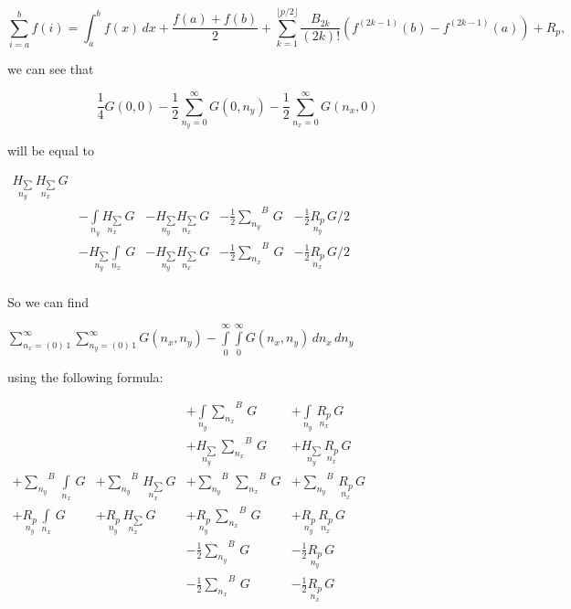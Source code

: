 \documentclass[11pt]{article}
\begin{document}
    \[{\displaystyle \sum _{i=a}^{b}f(i)=\int _{a}^{b}f(x)\,dx+{\frac {f(a)+f(b)}{2}}+\sum _{k=1}^{\lfloor p/2\rfloor }{\frac {B_{2k}}{(2k)!}}(f^{(2k-1)}(b)-f^{(2k-1)}(a))+R_{p},}\]

    we can see that

    \[
\frac{1}{4}G\left(0, 0\right)
- \frac{1}{2}\sum\limits_{n_y=0}^{\infty}{G\left(0, n_y\right)}
- \frac{1}{2}\sum\limits_{n_x=0}^{\infty}{G\left(n_x, 0\right)}
\]

    will be equal to

    \(\begin{array}{rrllll}  \underset{n_y}{H_{\sum}}\,\underset{n_x}{H_{\sum}}\,G \\  \, &  - \int\limits_{n_y}^{} \underset{n_x}{H_{\sum}}\,G &  - \underset{n_y}{H_{\sum}} \underset{n_x}{H_{\sum}}\,G &  - \frac{1}{2}{\sum\limits_{n_y}^{}}^{B}\,G &  - \frac{1}{2}\underset{n_y}{R_{p}}\,G/2 \\  \,&  - \underset{n_y}{H_{\sum}}\int\limits_{n_x}^{} \,G &  - \underset{n_y}{H_{\sum}} \underset{n_x}{H_{\sum}}\,G &  - \frac{1}{2}{\sum\limits_{n_x}^{}}^{B}\,G &  - \frac{1}{2}\underset{n_x}{R_{p}}\,G/2 \\ \end{array}\)

    So we can find

\(\sum\limits_{n_x=\left(0\right)\,1}^{\infty} \sum\limits_{n_y=\left(0\right)\,1}^{\infty} G\left(n_x, n_y\right) - \int\limits_{0}^{\infty} \int\limits_{0}^{\infty} G\left(n_x, n_y\right)\,d{n_x}\,d{n_y}\)

using the following formula:

    \(\begin{array}{llll}  \,&  \,&  + \int\limits_{n_y}^{}{\sum\limits_{n_x}^{}}^{B}\,G &  + \int\limits_{n_y}^{}\,\underset{n_x}{R_{p}}\,G \\  \,&  \,&  + \underset{n_y}{H_{\sum}}\,{\sum\limits_{n_x}^{}}^{B}\,G &  + \underset{n_y}{H_{\sum}}\,\underset{n_x}{R_{p}}\,G \\  + {\sum\limits_{n_y}^{}}^{B}\,\int\limits_{n_x}^{}\,G &  + {\sum\limits_{n_y}^{}}^{B}\,\underset{n_x}{H_{\sum}}\,G &  + {\sum\limits_{n_y}^{}}^{B}\,{\sum\limits_{n_x}^{}}^{B}\,G &  + {\sum\limits_{n_y}^{}}^{B}\,\underset{n_x}{R_{p}}\,G \\  + \underset{n_y}{R_{p}}\,\int\limits_{n_x}^{}\,G &  + \underset{n_y}{R_{p}}\,\underset{n_x}{H_{\sum}}\,G &  + \underset{n_y}{R_{p}}\,{\sum\limits_{n_x}^{}}^{B}\,G &  + \underset{n_y}{R_{p}}\,\underset{n_x}{R_{p}}\,G \\  \,&  \,&  - \frac{1}{2}{\sum\limits_{n_y}^{}}^{B}\,G &  - \frac{1}{2}\underset{n_y}{R_{p}}\,G \\  \,&  \,&  - \frac{1}{2}{\sum\limits_{n_x}^{}}^{B}\,G &  - \frac{1}{2}\underset{n_x}{R_{p}}\,G \\ \end{array}\)
\end{document}
